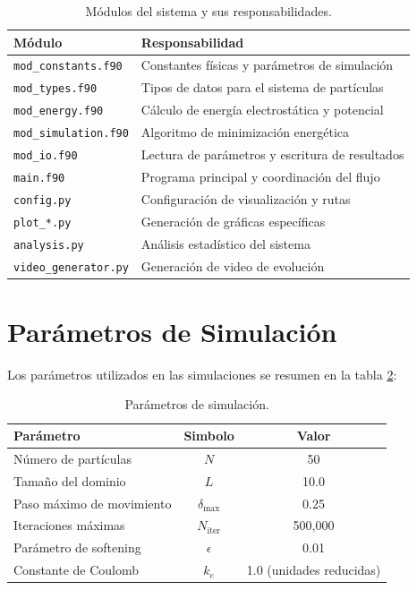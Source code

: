 \begin{table}[H]
    \centering
    \caption{Módulos del sistema y sus responsabilidades.}
    \label{tab:modulos}
    \begin{tabular}{ll}
        \toprule
        \textbf{Módulo} & \textbf{Responsabilidad} \\
        \midrule
        \texttt{mod\_constants.f90} & Constantes físicas y parámetros de simulación \\
        \texttt{mod\_types.f90} & Tipos de datos para el sistema de partículas \\
        \texttt{mod\_energy.f90} & Cálculo de energía electrostática y potencial \\
        \texttt{mod\_simulation.f90} & Algoritmo de minimización energética \\
        \texttt{mod\_io.f90} & Lectura de parámetros y escritura de resultados \\
        \texttt{main.f90} & Programa principal y coordinación del flujo \\
        \texttt{config.py} & Configuración de visualización y rutas \\
        \texttt{plot\_*.py} & Generación de gráficas específicas \\
        \texttt{analysis.py} & Análisis estadístico del sistema \\
        \texttt{video\_generator.py} & Generación de video de evolución \\
        \bottomrule
    \end{tabular}
\end{table}

\section{Parámetros de Simulación}
Los parámetros utilizados en las simulaciones se resumen en la tabla \ref{tab:parametros}:

\begin{table}[H]
    \centering
    \caption{Parámetros de simulación.}
    \label{tab:parametros}
    \begin{tabular}{lcc}
        \toprule
        \textbf{Parámetro} & \textbf{Simbolo} & \textbf{Valor} \\
        \midrule
        Número de partículas & \(N\) & 50 \\
        Tamaño del dominio & \(L\) & 10.0 \\
        Paso máximo de movimiento & \(\delta_{\text{max}}\) & 0.25 \\
        Iteraciones máximas & \(N_{\text{iter}}\) & 500,000 \\
        Parámetro de softening & \(\epsilon\) & 0.01 \\
        Constante de Coulomb & \(k_e\) & 1.0 (unidades reducidas) \\
        \bottomrule
    \end{tabular}
\end{table}

